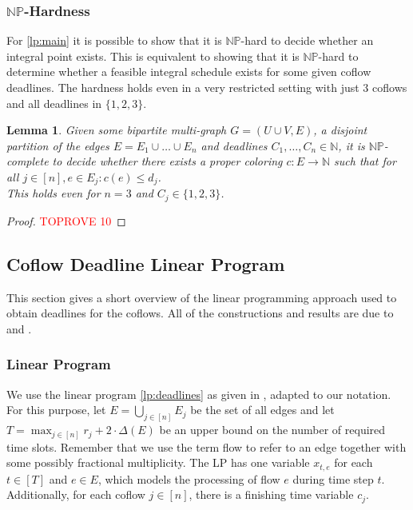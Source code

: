 \documentclass[11pt]{article}
\newtheorem{lemma}[theorem]{Lemma}
\begin{document}
\subsubsection*{$\mathbb{NP}$-Hardness}

For \ref{lp:main} it is possible to show that it is $\mathbb{NP}$-hard to decide whether an integral point exists. This is equivalent to showing that it is $\mathbb{NP}$-hard to determine whether a feasible integral schedule exists for some given coflow deadlines. The hardness holds even in a very restricted setting with just $3$ coflows and all deadlines in $\{1,2,3\}$.

\begin{lemma}\label{lemma:coflownphardness}
Given some bipartite multi-graph $G = (U \cup V, E)$, a disjoint partition of the edges $E = E_1 \cup \dotsc \cup E_n$ and deadlines $C_1,\dotsc,C_n \in \mathbb{N}$, it is $\mathbb{NP}$-complete to decide whether there exists a proper coloring $c: E \rightarrow \mathbb{N}$ such that for all $j \in [n], e \in E_j: c(e) \le d_j$.\\
This holds even for $n=3$ and $C_j \in \{1,2,3\}$.
\end{lemma}
\begin{proof}\textcolor{red}{TOPROVE 10}\end{proof}

\subsection{Coflow Deadline Linear Program}\label{sec:app:coflowdeadline}
This section gives a short overview of the linear programming approach used to obtain deadlines for the coflows. All of the constructions and results are due to \cite{fukunaga22} and \cite{im19}.
\subsubsection*{Linear Program}
We use the linear program \ref{lp:deadlines} as given in \cite{fukunaga22}, adapted to our notation. For this purpose, let $E = \bigcup_{j \in [n]}E_j$ be the set of all edges and let $T = \max_{j \in [n]}r_j + 2\cdot \Delta(E)$ be an upper bound on the number of required time slots. Remember that we use the term flow to refer to an edge together with some possibly fractional multiplicity. The LP has one variable $x_{t,e}$ for each $t \in [T]$ and $e \in E$, which models the processing of flow $e$ during time step $t$. Additionally, for each coflow $j \in [n]$, there is a finishing time variable $c_j$.
\end{document}
